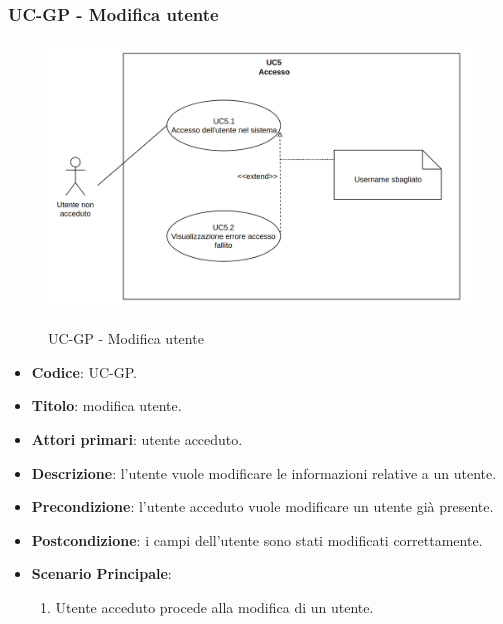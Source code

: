 \subsubsection{UC\theuccount-GP - Modifica utente}
		\begin{figure}[H]
			\centering
				\includegraphics[width=\columnwidth]{img/UC5.png}\\
			\caption{UC\theuccount-GP - Modifica utente}
		\end{figure}
	\begin{itemize}
		\item \textbf{Codice}: UC\theuccount-GP.
		\item \textbf{Titolo}: modifica utente.
		\item \textbf{Attori primari}: utente acceduto.
		\item \textbf{Descrizione}: l’utente vuole modificare le informazioni relative a un utente.
		\item \textbf{Precondizione}: l'utente acceduto vuole modificare un utente già presente.
		\item \textbf{Postcondizione}: i campi dell'utente sono stati modificati correttamente.
		\item \textbf{Scenario Principale}:
		\begin{enumerate}
			\item Utente acceduto procede alla modifica di un utente.
		\end{enumerate}
	\end{itemize}

